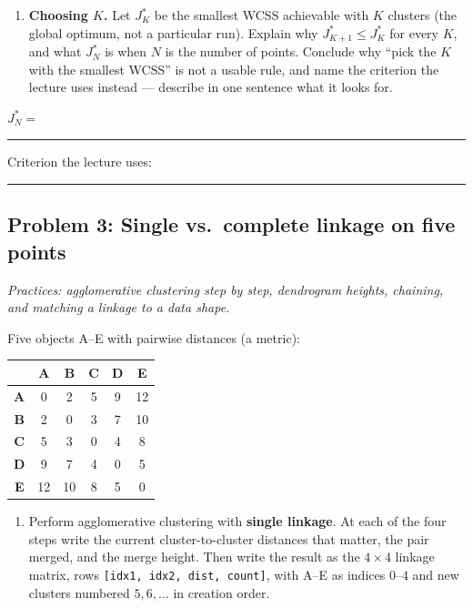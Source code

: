 \documentclass[
  11pt,
]{article}
\newcounter{none} %
\providecommand{\tightlist}{%
  \setlength{\itemsep}{0pt}\setlength{\parskip}{0pt}}
\newcommand{\answerspace}[1]{\par\vspace*{#1}}  %
\newcommand{\blank}[1][1.2in]{\rule{#1}{0.4pt}}
\newcommand{\answerpage}{\clearpage}
\begin{document}
\answerspace{2in}

\begin{enumerate}
\def\labelenumi{(\alph{enumi})}
\setcounter{enumi}{3}
\tightlist
\item
  \textbf{Choosing \(K\).} Let \(J^*_K\) be the smallest WCSS achievable
  with \(K\) clusters (the global optimum, not a particular run).
  Explain why \(J^*_{K+1} \le J^*_K\) for every \(K\), and what
  \(J^*_N\) is when \(N\) is the number of points. Conclude why ``pick
  the \(K\) with the smallest WCSS'' is not a usable rule, and name the
  criterion the lecture uses instead --- describe in one sentence what
  it looks for.
\end{enumerate}

\(J^*_N =\) \blank[0.8in] \qquad Criterion the lecture uses:
\blank[1.5in]

\answerspace{2.2in}

\answerpage

\subsection{Problem 3: Single vs.~complete linkage on five
points}\label{problem-3-single-vs.-complete-linkage-on-five-points}

\emph{Practices: agglomerative clustering step by step, dendrogram
heights, chaining, and matching a linkage to a data shape.}

Five objects A--E with pairwise distances (a metric):

{\def\LTcaptype{none} %
\begin{longtable}[]{@{}cccccc@{}}
\toprule\noalign{}
& A & B & C & D & E \\
\midrule\noalign{}
\endhead
\bottomrule\noalign{}
\endlastfoot
\textbf{A} & 0 & 2 & 5 & 9 & 12 \\
\textbf{B} & 2 & 0 & 3 & 7 & 10 \\
\textbf{C} & 5 & 3 & 0 & 4 & 8 \\
\textbf{D} & 9 & 7 & 4 & 0 & 5 \\
\textbf{E} & 12 & 10 & 8 & 5 & 0 \\
\end{longtable}
}

\begin{enumerate}
\def\labelenumi{(\alph{enumi})}
\tightlist
\item
  Perform agglomerative clustering with \textbf{single linkage}. At each
  of the four steps write the current cluster-to-cluster distances that
  matter, the pair merged, and the merge height. Then write the result
  as the \(4\times4\) linkage matrix, rows
  \texttt{{[}idx1,\ idx2,\ dist,\ count{]}}, with A--E as indices
  \(0\)--\(4\) and new clusters numbered \(5, 6, \dots\) in creation
  order.
\end{enumerate}
\end{document}
